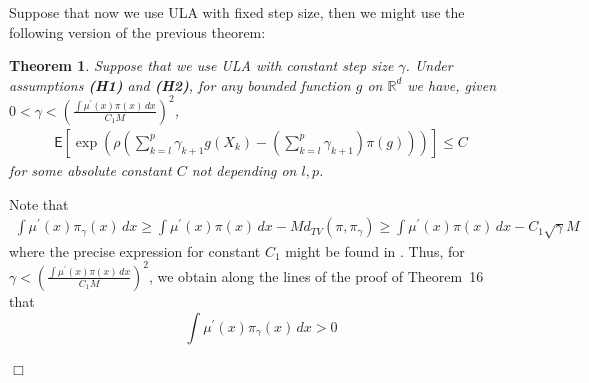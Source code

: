 \documentclass[bj]{imsart}
\newcommand{\proofendsign}{$\Box$}
\newtheorem{thm}{Theorem}
\newenvironment{proof}{{\noindent \bf Proof }}
 {{\hspace*{\fill}\proofendsign\par\bigskip}}
\begin{document}
Suppose that now we use ULA with fixed step size, then we might use the following version of the previous theorem:
\begin{thm} Suppose that we use ULA with constant step size $\gamma$. Under assumptions {\bf (H1)} and {\bf (H2)}, for any bounded function $g$ on $\mathbb{R}^d$ we have, given $0 < \gamma < \left(\frac{\int \mu^{\prime}(x)\pi(x)\,dx}{C_1 M}\right)^2$,
\begin{eqnarray*}
\mathsf{E}\left[\exp\left(\rho\left(\sum_{k=l}^{p}\gamma_{k+1}g(X_{k})-\left(\sum_{k=l}^{p}\gamma_{k+1}\right)\pi(g)\right)\right)\right]\leq C
\end{eqnarray*}
for some absolute constant $C$ not depending on $l,p$.
\end{thm}

\begin{proof} Note that 
\begin{eqnarray*} 
\int \mu^{\prime}(x)\pi_{\gamma}(x)\,dx \geq \int \mu^{\prime}(x)\pi(x)\,dx - M d_{TV}(\pi,\pi_{\gamma}) \geq \int \mu^{\prime}(x)\pi(x)\,dx - C_1\sqrt{\gamma}M
\end{eqnarray*}
where the precise expression for constant $C_1$ might be found in \cite[Theorem~10]{durmus:moulines:aop:2016}. Thus, for $\gamma < \left(\frac{\int \mu^{\prime}(x)\pi(x)\,dx}{C_1 M}\right)^2$, we obtain along the lines of the proof of Theorem~16 that
$$
\int \mu^{\prime}(x)\pi_{\gamma}(x)\,dx > 0
$$

\end{proof}



\end{document}
